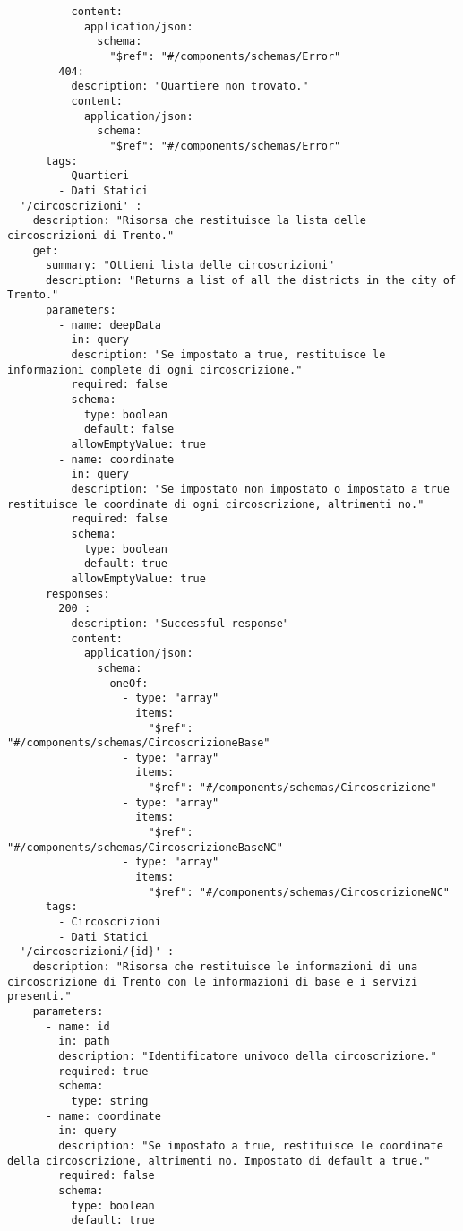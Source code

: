 \begin{verbatim}
          content:
            application/json:
              schema:
                "$ref": "#/components/schemas/Error"
        404: 
          description: "Quartiere non trovato."
          content: 
            application/json: 
              schema: 
                "$ref": "#/components/schemas/Error"
      tags:
        - Quartieri
        - Dati Statici
  '/circoscrizioni' : 
    description: "Risorsa che restituisce la lista delle circoscrizioni di Trento."
    get: 
      summary: "Ottieni lista delle circoscrizioni"
      description: "Returns a list of all the districts in the city of Trento."
      parameters:
        - name: deepData
          in: query
          description: "Se impostato a true, restituisce le informazioni complete di ogni circoscrizione."
          required: false
          schema:
            type: boolean
            default: false
          allowEmptyValue: true
        - name: coordinate
          in: query
          description: "Se impostato non impostato o impostato a true restituisce le coordinate di ogni circoscrizione, altrimenti no."
          required: false
          schema:
            type: boolean
            default: true
          allowEmptyValue: true
      responses:
        200 :
          description: "Successful response"
          content:
            application/json:
              schema: 
                oneOf:
                  - type: "array"
                    items: 
                      "$ref": "#/components/schemas/CircoscrizioneBase"
                  - type: "array"
                    items: 
                      "$ref": "#/components/schemas/Circoscrizione"
                  - type: "array"
                    items: 
                      "$ref": "#/components/schemas/CircoscrizioneBaseNC"
                  - type: "array"
                    items: 
                      "$ref": "#/components/schemas/CircoscrizioneNC"
      tags:
        - Circoscrizioni
        - Dati Statici
  '/circoscrizioni/{id}' :
    description: "Risorsa che restituisce le informazioni di una circoscrizione di Trento con le informazioni di base e i servizi presenti."
    parameters:
      - name: id
        in: path
        description: "Identificatore univoco della circoscrizione."
        required: true
        schema:
          type: string
      - name: coordinate
        in: query
        description: "Se impostato a true, restituisce le coordinate della circoscrizione, altrimenti no. Impostato di default a true."
        required: false
        schema:
          type: boolean
          default: true

\end{verbatim}
